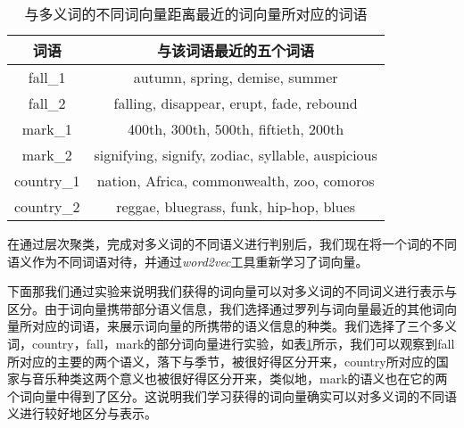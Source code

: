 \begin{longtable}{cc}
\caption[与多义词不同语义对应词向量距离最近的词语]{与多义词的不同词向量距离最近的词向量所对应的词语}
\label{tab:near4demo} \\
\toprule[1.5pt]
词语 & 与该词语最近的五个词语 \\
\midrule[1pt]
fall\_1	& autumn, spring, demise, summer\\
fall\_2 	& falling, disappear, erupt, fade, rebound\\
mark\_1	& 400th, 300th, 500th, fiftieth, 200th\\
mark\_2	& signifying, signify, zodiac, syllable, auspicious\\
country\_1	&	nation, Africa, commonwealth, zoo, comoros\\
country\_2	&	reggae, bluegrass, funk, hip-hop, blues\\
\endfirsthead
\end{longtable}

在通过层次聚类，完成对多义词的不同语义进行判别后，我们现在将一个词的不同语义作为不同词语对待，并通过\emph{word2vec}工具重新学习了词向量。

下面那我们通过实验来说明我们获得的词向量可以对多义词的不同词义进行表示与区分。由于词向量携带部分语义信息，我们选择通过罗列与词向量最近的其他词向量所对应的词语，来展示词向量的所携带的语义信息的种类。我们选择了三个多义词，country，fall，mark的部分词向量进行实验，如表\ref{tab:near4demo}所示，我们可以观察到fall所对应的主要的两个语义，落下与季节，被很好得区分开来，country所对应的国家与音乐种类这两个意义也被很好得区分开来，类似地，mark的语义也在它的两个词向量中得到了区分。这说明我们学习获得的词向量确实可以对多义词的不同语义进行较好地区分与表示。